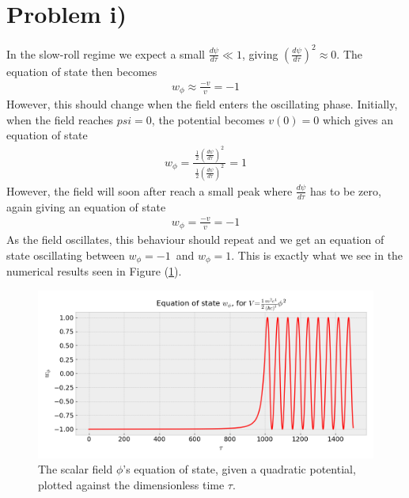 \documentclass[reprint,english,notitlepage]{revtex4-1}  %
\numberwithin{equation}{section}
\begin{document}
\section{Problem i)}
In the slow-roll regime we expect a small $\frac{d\psi}{d\tau}\ll1$, giving
$\left(\frac{d\psi}{d\tau}\right)^2 \approx 0$. The equation of state then
becomes
\begin{align}
	w_\phi \approx \frac{-v}{v} = -1
\end{align}
However, this should change when the field enters the oscillating phase.
Initially, when the field reaches $psi=0$, the potential becomes $v(0) =0$ which
gives an equation of state
\begin{align}
	w_\phi = \frac{\ \frac{1}{2}\left(\frac{d\psi}{d\tau}\right)^2 \ }{\frac{1}{2}\left(\frac{d\psi}{d\tau}\right)^2} = 1
\end{align}
However, the field will soon after reach a small peak where $\frac{d\psi}{d\tau}$
has to be zero, again giving an equation of state
\begin{align}
	w_\phi = \frac{-v}{v} = -1
\end{align}
As the field oscillates, this behaviour should repeat and we get an equation of
state oscillating between $w_\phi=-1$ and $w_\phi=1$. This is exactly what we
see in the numerical results seen in Figure (\ref{fig:QuadraticPotential_field-eos}).
\begin{figure}[h!]
	\includegraphics[width=\linewidth]{QuadraticPotential_field-eos.png}
	\caption{The scalar field $\phi$'s equation of state, given a quadratic
	potential, plotted against the dimensionless time $\tau$.}
	\label{fig:QuadraticPotential_field-eos}
\end{figure}
\end{document}
